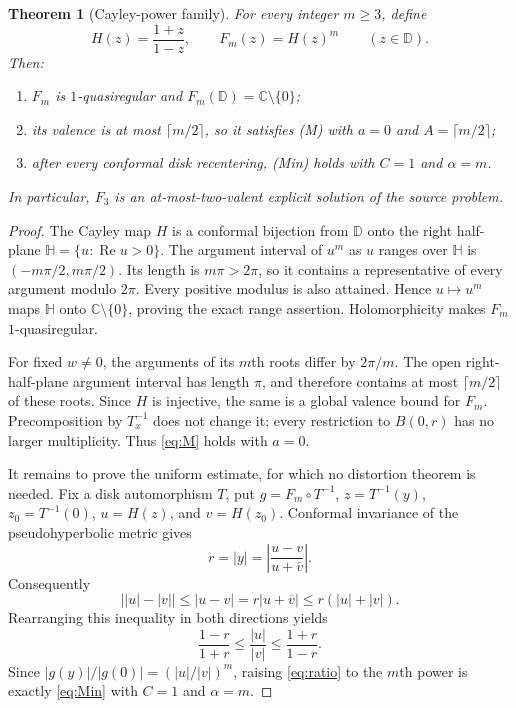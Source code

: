 \documentclass[10pt]{article}
\newtheorem{theorem}{Theorem}
\newcommand{\D}{\mathbb D}
\newcommand{\C}{\mathbb C}
\begin{document}
\begin{theorem}[Cayley-power family]\label{thm:main}
For every integer $m\ge3$, define
\begin{equation}\label{eq:Fm}
 H(z)=\frac{1+z}{1-z},\qquad F_m(z)=H(z)^m\qquad(z\in\D).
\end{equation}
Then:
\begin{enumerate}
 \item $F_m$ is $1$-quasiregular and $F_m(\D)=\C\setminus\{0\}$;
 \item its valence is at most $\lceil m/2\rceil$, so it satisfies (M) with
       $a=0$ and $A=\lceil m/2\rceil$;
 \item after every conformal disk recentering, (Min) holds with
       $C=1$ and $\alpha=m$.
\end{enumerate}
In particular, $F_3$ is an at-most-two-valent explicit solution of the source
problem.
\end{theorem}

\begin{proof}
The Cayley map $H$ is a conformal bijection from $\D$ onto the right
half-plane $\mathbb H=\{u:\operatorname{Re}u>0\}$.  The argument interval of
$u^m$ as $u$ ranges over $\mathbb H$ is
$(-m\pi/2,m\pi/2)$.  Its length is $m\pi>2\pi$, so it contains a
representative of every argument modulo $2\pi$.  Every positive modulus is
also attained.  Hence $u\mapsto u^m$ maps $\mathbb H$ onto
$\C\setminus\{0\}$, proving the exact range assertion.  Holomorphicity makes
$F_m$ $1$-quasiregular.

For fixed $w\ne0$, the arguments of its $m$th roots differ by $2\pi/m$.
The open right-half-plane argument interval has length $\pi$, and therefore
contains at most $\lceil m/2\rceil$ of these roots.  Since $H$ is injective,
the same is a global valence bound for $F_m$.  Precomposition by $T_x^{-1}$
does not change it; every restriction to $B(0,r)$ has no larger
multiplicity.  Thus \eqref{eq:M} holds with $a=0$.

It remains to prove the uniform estimate, for which no distortion theorem is
needed.  Fix a disk automorphism $T$, put $g=F_m\circ T^{-1}$,
$z=T^{-1}(y)$, $z_0=T^{-1}(0)$, $u=H(z)$, and $v=H(z_0)$.  Conformal
invariance of the pseudohyperbolic metric gives
\begin{equation}\label{eq:pseudo}
 r=|y|=\left|\frac{u-v}{u+\overline v}\right|.
\end{equation}
Consequently
\[
 \bigl||u|-|v|\bigr|\le |u-v|
 =r|u+\overline v|\le r(|u|+|v|).
\]
Rearranging this inequality in both directions yields
\begin{equation}\label{eq:ratio}
 \frac{1-r}{1+r}\le\frac{|u|}{|v|}
 \le\frac{1+r}{1-r}.
\end{equation}
Since $|g(y)|/|g(0)|=(|u|/|v|)^m$, raising \eqref{eq:ratio} to the
$m$th power is exactly \eqref{eq:Min} with $C=1$ and $\alpha=m$.
\end{proof}
\end{document}
